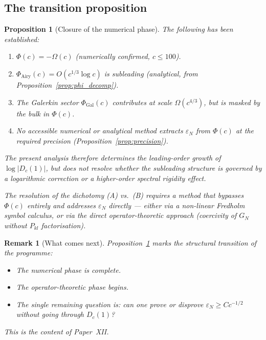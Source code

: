 \documentclass[12pt,a4paper]{article}
\newtheorem{proposition}[theorem]{Proposition}
\newtheorem{remark}[theorem]{Remark}
\newcommand{\Dc}{D_c}
\begin{document}
\subsection{The transition proposition}

\begin{proposition}[Closure of the numerical phase]
\label{prop:closure}
The following has been established:
\begin{enumerate}[nosep]
  \item $\Phi(c) = -\Omega(c)$
        (numerically confirmed, $c \leq 100$).
  \item $\Phi_{\mathrm{Airy}}(c) = O(c^{1/3}\log c)$
        is subleading (analytical, from Proposition~\ref{prop:phi_decomp}).
  \item The Galerkin sector $\Phi_{\mathrm{Gal}}(c)$
        contributes at scale $\Omega(c^{4/3})$,
        but is masked by the bulk in $\Phi(c)$.
  \item No accessible numerical or analytical method
        extracts $\varepsilon_N$ from $\Phi(c)$
        at the required precision
        (Proposition~\ref{prop:precision}).
\end{enumerate}
\noindent
The present analysis therefore determines the
leading-order growth of $\log|\Dc(1)|$,
but does \emph{not} resolve whether the subleading
structure is governed by a logarithmic correction
or a higher-order spectral rigidity effect.

\medskip\noindent
The resolution of the dichotomy (A) vs.\ (B)
requires a method that bypasses $\Phi(c)$ entirely
and addresses $\varepsilon_N$ directly ---
either via a non-linear Fredholm symbol calculus,
or via the direct operator-theoretic approach
(coercivity of $G_N$ without $P_{kl}$ factorisation).
\end{proposition}

\begin{remark}[What comes next]
Proposition~\ref{prop:closure} marks the
structural transition of the programme:
\begin{itemize}[nosep]
  \item The \emph{numerical phase} is complete.
  \item The \emph{operator-theoretic phase} begins.
  \item The single remaining question is:
        \emph{can one prove or disprove
        $\varepsilon_N \geq Cc^{-1/2}$
        without going through $\Dc(1)$?}
\end{itemize}
This is the content of Paper~XII.
\end{remark}
\end{document}
